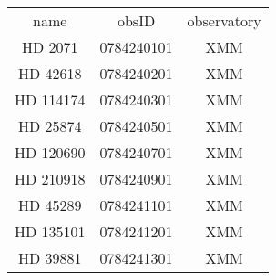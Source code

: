 \begin{table}
\begin{tabular}{ccc}
name & obsID & observatory \\
HD 2071 & 0784240101 & XMM \\
HD 42618 & 0784240201 & XMM \\
HD 114174 & 0784240301 & XMM \\
HD 25874 & 0784240501 & XMM \\
HD 120690 & 0784240701 & XMM \\
HD 210918 & 0784240901 & XMM \\
HD 45289 & 0784241101 & XMM \\
HD 135101 & 0784241201 & XMM \\
HD 39881 & 0784241301 & XMM \\
\end{tabular}
\end{table}
